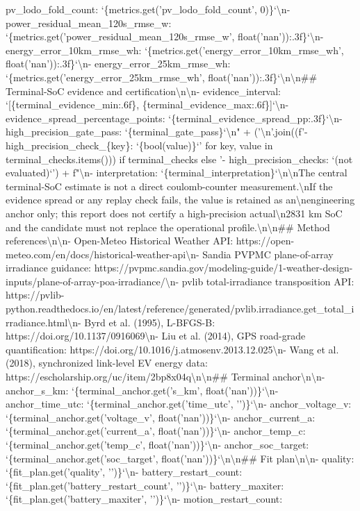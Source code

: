 \documentclass[a4paper,11pt]{article}
\begin{document}
\begin{enumerate}[leftmargin=1.8em]
pv\_lodo\_fold\_count: `\{metrics.get('pv\_lodo\_fold\_count', 0)\}`\textbackslash{}n- power\_residual\_mean\_120s\_rmse\_w: `\{metrics.get('power\_residual\_mean\_120s\_rmse\_w', float('nan')):.3f\}`\textbackslash{}n- energy\_error\_10km\_rmse\_wh: `\{metrics.get('energy\_error\_10km\_rmse\_wh', float('nan')):.3f\}`\textbackslash{}n- energy\_error\_25km\_rmse\_wh: `\{metrics.get('energy\_error\_25km\_rmse\_wh', float('nan')):.3f\}`\textbackslash{}n\textbackslash{}n\#\# Terminal-SoC evidence and certification\textbackslash{}n\textbackslash{}n- evidence\_interval: `[\{terminal\_evidence\_min:.6f\}, \{terminal\_evidence\_max:.6f\}]`\textbackslash{}n- evidence\_spread\_percentage\_points: `\{terminal\_evidence\_spread\_pp:.3f\}`\textbackslash{}n- high\_precision\_gate\_pass: `\{terminal\_gate\_pass\}`\textbackslash{}n" + ('\textbackslash{}n'.join((f'- high\_precision\_check\_\{key\}: `\{bool(value)\}`' for key, value in terminal\_checks.items())) if terminal\_checks else '- high\_precision\_checks: `(not evaluated)`') + f"\textbackslash{}n- interpretation: `\{terminal\_interpretation\}`\textbackslash{}n\textbackslash{}nThe central terminal-SoC estimate is not a direct coulomb-counter measurement.\textbackslash{}nIf the evidence spread or any replay check fails, the value is retained as an\textbackslash{}nengineering anchor only; this report does not certify a high-precision actual\textbackslash{}n2831 km SoC and the candidate must not replace the operational profile.\textbackslash{}n\textbackslash{}n\#\# Method references\textbackslash{}n\textbackslash{}n- Open-Meteo Historical Weather API: https://open-meteo.com/en/docs/historical-weather-api\textbackslash{}n- Sandia PVPMC plane-of-array irradiance guidance: https://pvpmc.sandia.gov/modeling-guide/1-weather-design-inputs/plane-of-array-poa-irradiance/\textbackslash{}n- pvlib total-irradiance transposition API: https://pvlib-python.readthedocs.io/en/latest/reference/generated/pvlib.irradiance.get\_total\_irradiance.html\textbackslash{}n- Byrd et al. (1995), L-BFGS-B: https://doi.org/10.1137/0916069\textbackslash{}n- Liu et al. (2014), GPS road-grade quantification: https://doi.org/10.1016/j.atmosenv.2013.12.025\textbackslash{}n- Wang et al. (2018), synchronized link-level EV energy data: https://escholarship.org/uc/item/2bp8x04q\textbackslash{}n\textbackslash{}n\#\# Terminal anchor\textbackslash{}n\textbackslash{}n- anchor\_s\_km: `\{terminal\_anchor.get('s\_km', float('nan'))\}`\textbackslash{}n- anchor\_time\_utc: `\{terminal\_anchor.get('time\_utc', '')\}`\textbackslash{}n- anchor\_voltage\_v: `\{terminal\_anchor.get('voltage\_v', float('nan'))\}`\textbackslash{}n- anchor\_current\_a: `\{terminal\_anchor.get('current\_a', float('nan'))\}`\textbackslash{}n- anchor\_temp\_c: `\{terminal\_anchor.get('temp\_c', float('nan'))\}`\textbackslash{}n- anchor\_soc\_target: `\{terminal\_anchor.get('soc\_target', float('nan'))\}`\textbackslash{}n\textbackslash{}n\#\# Fit plan\textbackslash{}n\textbackslash{}n- quality: `\{fit\_plan.get('quality', '')\}`\textbackslash{}n- battery\_restart\_count: `\{fit\_plan.get('battery\_restart\_count', '')\}`\textbackslash{}n- battery\_maxiter: `\{fit\_plan.get('battery\_maxiter', '')\}`\textbackslash{}n- motion\_restart\_count: 
\end{enumerate}
\end{document}
